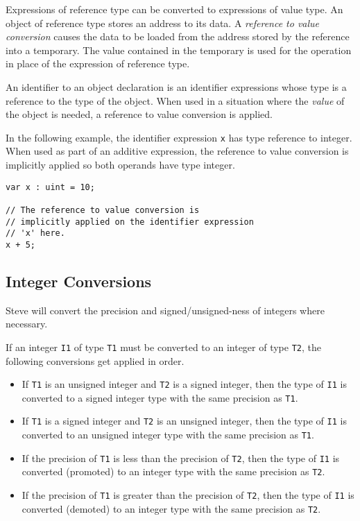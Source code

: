 Expressions of reference type can be converted to expressions of value type. An object of reference type stores an address to its data. A \textit{reference to value conversion} causes the data to be loaded from the address stored by the reference into a temporary. The value contained in the temporary is used for the operation in place of the expression of reference type.

An identifier to an object declaration is an identifier expressions whose type is a reference to the type of the object. When used in a situation where the \textit{value} of the object is needed, a reference to value conversion is applied.

In the following example, the identifier expression \texttt{x} has type reference to integer. When used as part of an additive expression, the reference to value conversion is implicitly applied so both operands have type integer.

\begin{minip}
\begin{lstlisting}
var x : uint = 10;

// The reference to value conversion is
// implicitly applied on the identifier expression
// 'x' here.
x + 5;
\end{lstlisting}
\end{minip}

\subsection{Integer Conversions} \label{int_conv}

Steve will convert the precision and signed/unsigned-ness of integers where necessary.

If an integer \texttt{I1} of type \texttt{T1} must be converted to an integer of type \texttt{T2}, the following conversions get applied in order.

\begin{itemize}
\item If \texttt{T1} is an unsigned integer and \texttt{T2} is a signed integer, then the type of \texttt{I1} is converted to a signed integer type with the same precision as \texttt{T1}.

\item If \texttt{T1} is a signed integer and \texttt{T2} is an unsigned integer, then the type of \texttt{I1} is converted to an unsigned integer type with the same precision as \texttt{T1}.

\item If the precision of \texttt{T1} is less than the precision of \texttt{T2}, then the type of \texttt{I1} is converted (promoted) to an integer type with the same precision as \texttt{T2}.

\item If the precision of \texttt{T1} is greater than the precision of \texttt{T2}, then the type of \texttt{I1} is converted (demoted) to an integer type with the same precision as \texttt{T2}.
\end{itemize}

